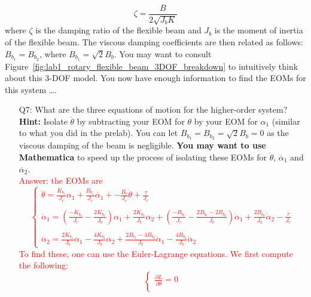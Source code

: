 \documentclass[12pt]{report}
\newcommand\drew[1]{\textcolor{red}{#1}}
\newcommand{\pder}[2]{\frac{\partial #1}{\partial #2}}
\begin{document}
\[
    \zeta = \frac{B}{2\sqrt{J_b K}}
\]
where  $\zeta$ is the damping ratio of the flexible beam and $J_b$ is the moment of inertia of the flexible beam. The viscous damping coefficients are then related as follows: $B_{b_1} = B_{b_2}$, where $B_{b_1} = \sqrt{2} B_b$. You may want to consult Figure~\ref{fig:lab1_rotary_flexible_beam_3DOF_breakdown} to intuitively think about this 3-DOF model.
You now have enough information to find the EOMs for this system \dots.
\begin{enumerate}[Question]
    \item[Q7:] What are the three equations of motion for the higher-order system?\\
          \textbf{Hint:} Isolate $\ddot{\theta}$ by subtracting your EOM for $\theta$ by your EOM for $\alpha_1$ (similar to what you did in the prelab). You can let $B_{b_1} = B_{b_2} = \sqrt{2}B_b = 0$ as the viscous damping of the beam is negligible. \textbf{You may want to use Mathematica} to speed up the process of isolating these EOMs for $\ddot{\theta}$, $\ddot{\alpha_1}$ and $\ddot{\alpha_2}$.\\
          \drew{Answer: the EOMs are
              \[
                  \begin{cases}
                      \ddot{\theta} = \frac{K_{b_1}}{J_r} \alpha_1 + \frac{B_{b_1}}{J_r} \dot{\alpha_1} + -\frac{B_r}{J_r} \dot{\theta} + \frac{\tau}{J_r}                                                                                                                             \\
                      \\
                      \ddot{\alpha}_1 = \left(\frac{-K_{b_1}}{J_r}-\frac{2 K_{b_1}}{J_b}\right)\alpha_1 + \frac{2 K_{b_2}}{J_b}\alpha_2 + \left(\frac{-B_{b_1}}{J_r} - \frac{2 B_{b_1} - 2 B_{b_2}}{J_b}\right)\dot{\alpha}_1 + \frac{2 B_{b_2}}{J_b}\dot{\alpha}_2 - \frac{\tau}{J_r} \\
                      \\
                      \ddot{\alpha}_2 = \frac{2 K_{b_1}}{J_b}\alpha_1 - \frac{4 K_{b_2}}{J_b}\alpha_2 + \frac{2 B_{b_1} - 4 B_{b_2}}{J_b}\dot{\alpha}_1 - \frac{4 B_{b_2}}{J_b}\dot{\alpha}_2
                  \end{cases}
              \]
              To find these, one can use the Euler-Lagrange equations. We first compute the following:
              \[
                  \begin{cases}
                      \pder{L}{\theta} = 0                                                                                                                                                \\

\end{cases}\]}
\end{enumerate}
\end{document}
